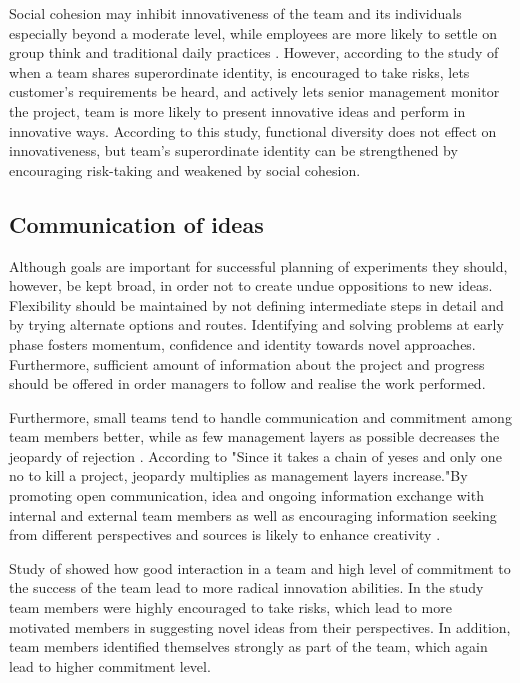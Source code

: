 Social cohesion may inhibit innovativeness of the team and its individuals especially beyond a moderate level, while employees are more likely to settle on group think and traditional daily practices \citep{janis1982groupthink}. However, according to the study of\citet{sethi2001cross} when a team shares superordinate identity, is encouraged to take risks, lets customer's requirements be heard, and actively lets senior management monitor the project, team is more likely to present innovative ideas and perform in innovative ways. According to this study, functional diversity does not effect on innovativeness, but team's superordinate identity can be strengthened by encouraging risk-taking and weakened by social cohesion.

\subsection{Communication of ideas}
Although goals are important for successful planning of experiments they should, however, be kept broad, in order not to create undue oppositions to new ideas. Flexibility should be maintained by not defining intermediate steps in detail and by trying alternate options and routes. Identifying and solving problems at early phase fosters momentum, confidence and identity towards novel approaches. Furthermore, sufficient amount of information about the project and progress should be offered in order managers to follow and realise the work performed. \citep{quinn1985managing}

Furthermore, small teams tend to handle communication and commitment among team members better, while as few management layers as possible decreases the jeopardy of rejection \citep{quinn1985managing}. According to \citet{quinn1985managing} "Since it takes a chain of yeses and only one no to kill a project, jeopardy multiplies as management layers increase."By promoting open communication, idea and ongoing information exchange with internal and external team members as well as encouraging information seeking from different perspectives and sources is likely to enhance creativity \citep{ancona1992demography,dougherty1996sustained}. 

Study of \citet{sethi2001cross} showed how good interaction in a team and high level of commitment to the success of the team lead to more radical innovation abilities. In the study team members were highly encouraged to take risks, which lead to more motivated members in suggesting novel ideas from their perspectives. In addition, team members identified themselves strongly as part of the team, which again lead to higher commitment level. \citep{sethi2001cross}

